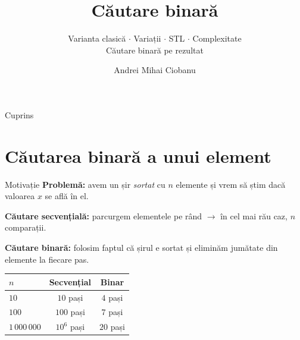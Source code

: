 ﻿\documentclass{beamer}
\title{Căutare binară}
\subtitle{Varianta clasică $\cdot$ Variații $\cdot$ STL $\cdot$ Complexitate \\ Căutare binară pe rezultat}
\author{Andrei Mihai Ciobanu}
\institute{Algolymp Summer School}
\date{}
\begin{document}
\begin{frame}[shrink]
  \titlepage
\end{frame}

\begin{frame}{Cuprins}
  \tableofcontents
\end{frame}

\section{Căutarea binară a unui element}

\begin{frame}{Motivație}
  \textbf{Problemă:} avem un șir \emph{sortat} cu $n$ elemente și vrem să știm dacă valoarea $x$ se află în el.

  \textbf{Căutare secvențială:} parcurgem elementele pe rând $\rightarrow$ în cel mai rău caz, $n$ comparații.

  \textbf{Căutare binară:} folosim faptul că șirul e sortat și eliminăm jumătate din elemente la fiecare pas.

  \smallskip
  \begin{center}
  \begin{tabular}{lcc}
    \toprule
    $n$ & Secvențial & Binar \\
    \midrule
    $10$            & $10$ pași       & $4$ pași  \\
    $100$           & $100$ pași      & $7$ pași  \\
    $1\,000\,000$   & $10^6$ pași     & $20$ pași \\
    \bottomrule
  \end{tabular}
  \end{center}
\end{frame}
\end{document}
